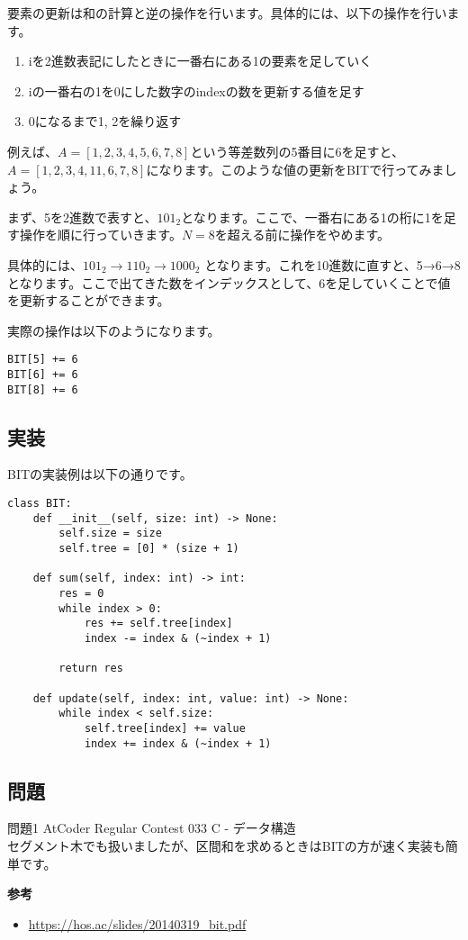 要素の更新は和の計算と逆の操作を行います。具体的には、以下の操作を行います。

\begin{enumerate}
	\item iを2進数表記にしたときに一番右にある1の要素を足していく
	\item iの一番右の1を0にした数字のindexの数を更新する値を足す
	\item 0になるまで1, 2を繰り返す
\end{enumerate}

例えば、$A = [1, 2, 3, 4, 5, 6, 7, 8]$という等差数列の5番目に6を足すと、$A = [1, 2, 3, 4, 11, 6, 7, 8]$になります。このような値の更新をBITで行ってみましょう。

まず、5を2進数で表すと、$101_2$となります。ここで、一番右にある1の桁に1を足す操作を順に行っていきます。$N = 8$を超える前に操作をやめます。

具体的には、$101_2 \rightarrow 110_2 \rightarrow 1000_2$ となります。これを10進数に直すと、5→6→8となります。ここで出てきた数をインデックスとして、6を足していくことで値を更新することができます。

実際の操作は以下のようになります。

\begin{verbatim}
BIT[5] += 6
BIT[6] += 6
BIT[8] += 6
\end{verbatim}

\subsection{実装}
BITの実装例は以下の通りです。

\begin{lstlisting}[caption=BITの実装, label=bit, frame=TRBL, label={bit}]
class BIT:
    def __init__(self, size: int) -> None:
        self.size = size
        self.tree = [0] * (size + 1)
    
    def sum(self, index: int) -> int:
        res = 0
        while index > 0:
            res += self.tree[index]
            index -= index & (~index + 1)
        
        return res
    
    def update(self, index: int, value: int) -> None:
        while index < self.size:
            self.tree[index] += value
            index += index & (~index + 1)
\end{lstlisting}

\subsection{問題}
\noindent 問題1 AtCoder Regular Contest 033 C - データ構造 \\
セグメント木でも扱いましたが、区間和を求めるときはBITの方が速く実装も簡単です。

\textbf{参考}
\begin{itemize}
	\item \url{https://hos.ac/slides/20140319_bit.pdf}
\end{itemize}